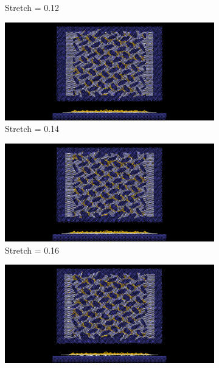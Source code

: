 \begin{figure}[H]
\begin{subfigure}[b]{0.49\textwidth}
        \caption{Stretch = 0.12}
        \label{fig:}
    \end{subfigure}
    \hfill
    \begin{subfigure}[b]{0.49\textwidth}
        \centering
        \includegraphics[width=\textwidth]{figures/baseline/contact_vs_stretch/popup/pop_stretch0014.png}
        \caption{Stretch = 0.14}
        \label{fig:}
    \end{subfigure}
    \begin{subfigure}[b]{0.49\textwidth}
        \centering
        \includegraphics[width=\textwidth]{figures/baseline/contact_vs_stretch/popup/pop_stretch0016.png}
        \caption{Stretch = 0.16}
        \label{fig:}
    \end{subfigure}
    \hfill
    \begin{subfigure}[b]{0.49\textwidth}
        \centering
        \includegraphics[width=\textwidth]{figures/baseline/contact_vs_stretch/popup/pop_stretch0018.png}

\end{subfigure}
\end{figure}
